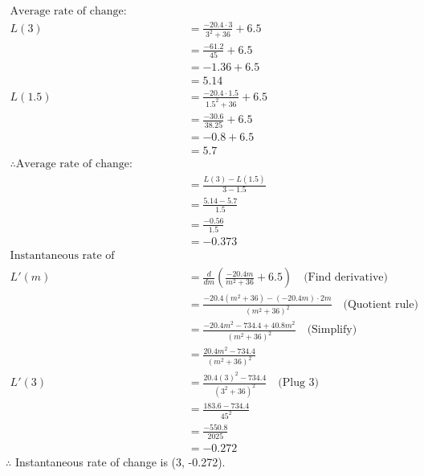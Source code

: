 \documentclass{article}
\newenvironment{solution}{\color{solutioncolor}}{}
\begin{document}
\begin{solution}
    \begin{align*}
        \text{Average rate of change:} \\
        L(3) &= \frac{-20.4 \cdot 3}{3^2 + 36} + 6.5 \\
        &= \frac{-61.2}{45} + 6.5 \\
        &= -1.36 + 6.5 \\
        &= 5.14 \\
        L(1.5) &= \frac{-20.4 \cdot 1.5}{1.5^2 + 36} + 6.5 \\
        &= \frac{-30.6}{38.25} + 6.5 \\
        &= -0.8 + 6.5 \\
        &= 5.7 \\
       \therefore \text{Average rate of change:} \\
        &= \frac{L(3) - L(1.5)}{3 - 1.5} \\
        &= \frac{5.14 - 5.7}{1.5} \\
        &= \frac{-0.56}{1.5} \\
        &= -0.373 \\
        \text{Instantaneous rate of change(Literally calculus): } \\
        L'(m) &= \frac{d}{dm} \left( \frac{-20.4m}{m^2 + 36} + 6.5 \right) \quad \text{(Find derivative)}\\
        &= \frac{-20.4(m^2 + 36) - (-20.4m) \cdot 2m}{(m^2 + 36)^2} \quad \text{(Quotient rule)}\\
        &= \frac{-20.4m^2 - 734.4 + 40.8m^2}{(m^2 + 36)^2} \quad \text{(Simplify) } \\
        &= \frac{20.4m^2 - 734.4}{(m^2 + 36)^2} \\
        L'(3) &= \frac{20.4(3)^2 - 734.4}{(3^2 + 36)^2} \quad \text{(Plug 3)} \\
        &= \frac{183.6 - 734.4}{45^2} \\
        &= \frac{-550.8}{2025} \\
        &= -0.272
    \end{align*}
        $\therefore$ Instantaneous rate of change is (3, -0.272).
    
\end{solution}
\end{document}
